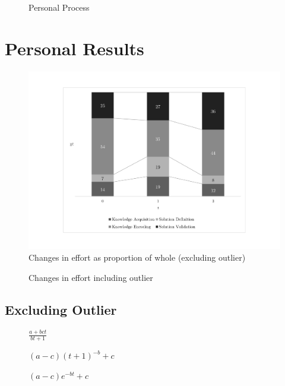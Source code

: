 \documentclass[a4paper,10pt]{article}
\begin{document}
\begin{appendices}
\begin{figure}[!htb]
\begin{tikzpicture}[node distance=1cm]
    \end{tikzpicture}
    \caption{Personal Process}
    \label{fig:personalprocess}
  \end{figure}

  \clearpage
  \section{Personal Results}
  \label{sec:personalresults}
  
  \begin{figure}[!htb]
  \centering
  \includegraphics[height=0.65\textwidth]{graphs/percentage3.pdf}
  \caption{Changes in effort as proportion of whole (excluding outlier)}
  \end{figure}

  \begin{figure}[!htb]
  \centering
  
  \caption{Changes in effort including outlier}
  \end{figure}
 
  
  \clearpage
  \subsection{Excluding Outlier}
  \begin{figure}[!htb]
  \centering
  
  \caption{$\frac{a+bct}{bt+1}$}
  \end{figure}
  
  \begin{figure}[!htb]
  \centering
  
  \caption{$(a-c)(t+1)^{-b}+c$}
  \end{figure}
  
  \begin{figure}[!htb]
  \centering
  
  \caption{$(a-c) e^{-bt} + c$}
  \end{figure}
  

\end{appendices}
\end{document}
